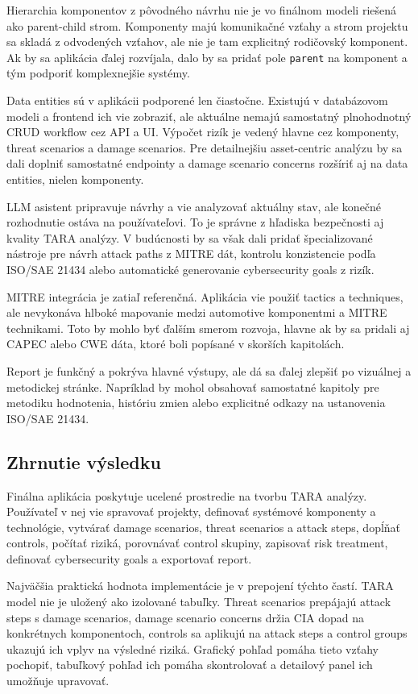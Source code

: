 \documentclass[11pt]{article}
\begin{document}
Hierarchia komponentov z pôvodného návrhu nie je vo finálnom modeli riešená ako parent-child strom. Komponenty majú komunikačné vzťahy a strom projektu sa skladá z odvodených vzťahov, ale nie je tam explicitný rodičovský komponent. Ak by sa aplikácia ďalej rozvíjala, dalo by sa pridať pole \texttt{parent} na komponent a tým podporiť komplexnejšie systémy.

Data entities sú v aplikácii podporené len čiastočne. Existujú v databázovom modeli a frontend ich vie zobraziť, ale aktuálne nemajú samostatný plnohodnotný CRUD workflow cez API a UI. Výpočet rizík je vedený hlavne cez komponenty, threat scenarios a damage scenarios. Pre detailnejšiu asset-centric analýzu by sa dali doplniť samostatné endpointy a damage scenario concerns rozšíriť aj na data entities, nielen komponenty.

LLM asistent pripravuje návrhy a vie analyzovať aktuálny stav, ale konečné rozhodnutie ostáva na používateľovi. To je správne z hľadiska bezpečnosti aj kvality TARA analýzy. V budúcnosti by sa však dali pridať špecializované nástroje pre návrh attack paths z MITRE dát, kontrolu konzistencie podľa ISO/SAE 21434 alebo automatické generovanie cybersecurity goals z rizík.

MITRE integrácia je zatiaľ referenčná. Aplikácia vie použiť tactics a techniques, ale nevykonáva hlboké mapovanie medzi automotive komponentmi a MITRE technikami. Toto by mohlo byť ďalším smerom rozvoja, hlavne ak by sa pridali aj CAPEC alebo CWE dáta, ktoré boli popísané v skorších kapitolách.

Report je funkčný a pokrýva hlavné výstupy, ale dá sa ďalej zlepšiť po vizuálnej a metodickej stránke. Napríklad by mohol obsahovať samostatné kapitoly pre metodiku hodnotenia, históriu zmien alebo explicitné odkazy na ustanovenia ISO/SAE 21434.

\subsection{Zhrnutie výsledku}

Finálna aplikácia poskytuje ucelené prostredie na tvorbu TARA analýzy. Používateľ v nej vie spravovať projekty, definovať systémové komponenty a technológie, vytvárať damage scenarios, threat scenarios a attack steps, dopĺňať controls, počítať riziká, porovnávať control skupiny, zapisovať risk treatment, definovať cybersecurity goals a exportovať report.

Najväčšia praktická hodnota implementácie je v prepojení týchto častí. TARA model nie je uložený ako izolované tabuľky. Threat scenarios prepájajú attack steps s damage scenarios, damage scenario concerns držia CIA dopad na konkrétnych komponentoch, controls sa aplikujú na attack steps a control groups ukazujú ich vplyv na výsledné riziká. Grafický pohľad pomáha tieto vzťahy pochopiť, tabuľkový pohľad ich pomáha skontrolovať a detailový panel ich umožňuje upravovať.
\end{document}
